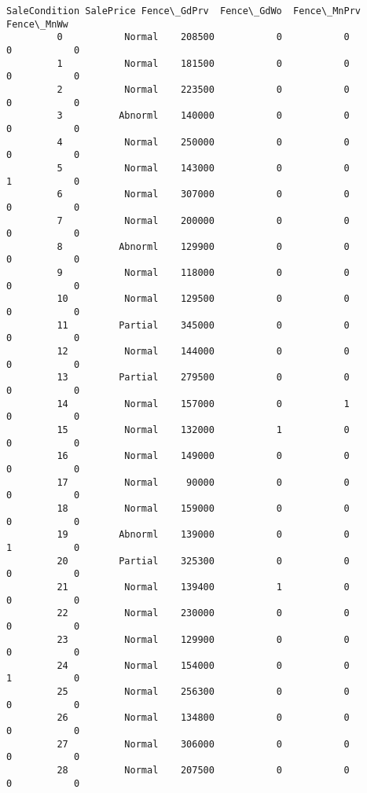 \documentclass[11pt]{article}
\begin{document}
\begin{Verbatim}[commandchars=\\\{\}]
              SaleCondition SalePrice Fence\_GdPrv  Fence\_GdWo  Fence\_MnPrv  Fence\_MnWw  
         0           Normal    208500           0           0            0           0  
         1           Normal    181500           0           0            0           0  
         2           Normal    223500           0           0            0           0  
         3          Abnorml    140000           0           0            0           0  
         4           Normal    250000           0           0            0           0  
         5           Normal    143000           0           0            1           0  
         6           Normal    307000           0           0            0           0  
         7           Normal    200000           0           0            0           0  
         8          Abnorml    129900           0           0            0           0  
         9           Normal    118000           0           0            0           0  
         10          Normal    129500           0           0            0           0  
         11         Partial    345000           0           0            0           0  
         12          Normal    144000           0           0            0           0  
         13         Partial    279500           0           0            0           0  
         14          Normal    157000           0           1            0           0  
         15          Normal    132000           1           0            0           0  
         16          Normal    149000           0           0            0           0  
         17          Normal     90000           0           0            0           0  
         18          Normal    159000           0           0            0           0  
         19         Abnorml    139000           0           0            1           0  
         20         Partial    325300           0           0            0           0  
         21          Normal    139400           1           0            0           0  
         22          Normal    230000           0           0            0           0  
         23          Normal    129900           0           0            0           0  
         24          Normal    154000           0           0            1           0  
         25          Normal    256300           0           0            0           0  
         26          Normal    134800           0           0            0           0  
         27          Normal    306000           0           0            0           0  
         28          Normal    207500           0           0            0           0  

\end{Verbatim}
\end{document}
